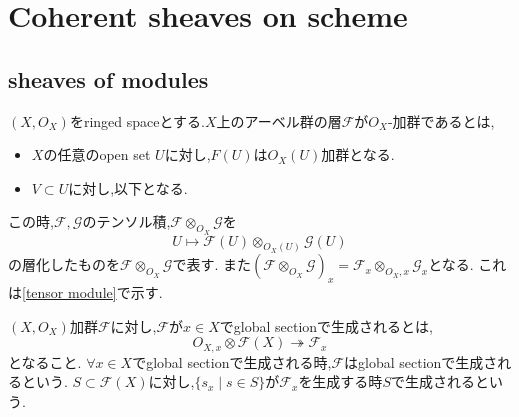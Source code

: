 \section{Coherent sheaves on scheme}
\subsection{sheaves of modules}

\begin{screen}
\begin{dfn}
 $(X, O_X)$をringed spaceとする.$X$上のアーベル群の層$\mathcal{F}$が$O_X$-加群であるとは,
 \begin{itemize}
   \item $X$の任意のopen set $U$に対し,$F(U)$は$O_X(U)$加群となる.
   \item $V \subset U$に対し,以下となる.

\end{itemize}
\end{dfn}
\end{screen}


この時,$\mathcal{F},\mathcal{G}$のテンソル積,$\mathcal{F} \otimes_{O_X} \mathcal{G}$を
\begin{equation*}
U \mapsto \mathcal{F}(U) \otimes_{O_X(U)} \mathcal{G}(U)
\end{equation*}
の層化したものを$\mathcal{F} \otimes_{O_X} \mathcal{G}$で表す.
また$(\mathcal{F} \otimes_{O_X} \mathcal{G})_x = \mathcal{F}_x \otimes_{O_X, x} \mathcal{G}_x$となる.
これは\ref{tensor module}で示す.


\begin{screen}
\begin{dfn}
$(X, O_X)$加群$\mathcal{F}$に対し,$\mathcal{F}$が$x \in X$でglobal sectionで生成されるとは,
\begin{equation*}
  O_{X,x} \otimes \mathcal{F}(X) \twoheadrightarrow \mathcal{F}_x
\end{equation*}
となること.
$\forall x \in X$でglobal sectionで生成される時,$\mathcal{F}$はglobal sectionで生成されるという.
$S \subset \mathcal{F}(X)$に対し,$\{s_x \mid s \in S\}$が$\mathcal{F}_x$を生成する時$S$で生成されるという.
\end{dfn}
\end{screen}

